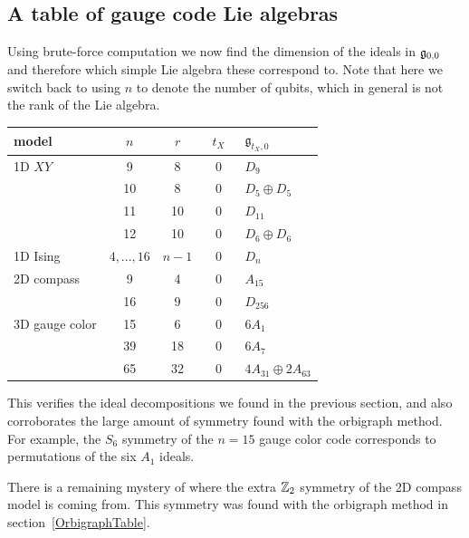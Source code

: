 \subsection{A table of gauge code Lie algebras}

Using brute-force computation
we now find the dimension of the ideals in $\mathfrak{g}_{0,0}$
and therefore which simple Lie algebra these correspond to.
Note that here we switch back to
using $n$ to denote the number of qubits,
which in general is not the rank of the Lie algebra.
\begin{center}
\begin{tabular}{ l|c|c|c|l } 
model &\ $n$\ &\ $r$\ &\ $t_X$\ & $\mathfrak{g}_{t_X,0}$   \\
\hline
     1D $XY$  &  9 &  8 & 0 & $D_9$   \\
             & 10 &  8 & 0 & $D_5\oplus D_5$   \\
             & 11 &  10 & 0 & $D_{11}$   \\
             & 12 &  10 & 0 & $D_6\oplus D_6$   \\
\hline
    1D Ising & $4,...,16$  & $n-1$  & 0  & $D_n$   \\
\hline
    2D compass & 9 & 4 & 0 &  $A_{15}$  \\
            & 16 & 9 & 0 & $D_{256}$ \\
\hline
    3D gauge color & 15 & 6  & 0 & $6A_1$  \\
                & 39 & 18 & 0 & $6A_{7}$ \\
                & 65 & 32 & 0 & $4A_{31}\oplus 2A_{63} $  \\
\end{tabular}
\end{center}

This verifies the ideal decompositions we found in the
previous section, and also corroborates the large
amount of symmetry found with the orbigraph method.
For example, the $S_6$ symmetry of
the $n=15$ gauge color code corresponds to
permutations of the six $A_1$ ideals.

There is a remaining mystery of where
the extra $\mathbb{Z}_2$ symmetry of the 2D compass model is coming from.
This symmetry was found with the orbigraph method in section~\ref{OrbigraphTable}.

